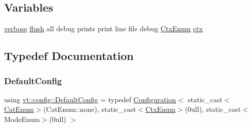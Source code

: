 \subsection*{Variables}
\begin{DoxyCompactItemize}
\item 
\hyperlink{namespacevt_1_1config_a724e99568632cc0fe9c456c2230270d0a9b54bf70f7b7fe7cfb6f3da0e167ae27}{verbose} \hyperlink{namespacevt_1_1config_a724e99568632cc0fe9c456c2230270d0a5c484f36b0f33ded7e640cc30fe5e725}{flush} all debug prints print line file debug \hyperlink{namespacevt_1_1config_a46e57c33bee1b9f1fa95455af86d80e0}{Ctx\+Enum} \hyperlink{namespacevt_1_1config_a0551245b6b893932b95aaf8eac94eed1}{ctx}
\end{DoxyCompactItemize}


\subsection{Typedef Documentation}
\mbox{\label{namespacevt_1_1config_a889b68143f3ecf39ea84dadfb9dfda3f}} 
\subsubsection{\texorpdfstring{Default\+Config}{DefaultConfig}}
{\footnotesize\ttfamily using \hyperlink{namespacevt_1_1config_a889b68143f3ecf39ea84dadfb9dfda3f}{vt\+::config\+::\+Default\+Config} = typedef \hyperlink{structvt_1_1config_1_1_configuration}{Configuration}$<$ static\+\_\+cast$<$\hyperlink{namespacevt_1_1config_a6bd1d6215bda0d8ca02811798399f689}{Cat\+Enum}$>$(Cat\+Enum\+::none), static\+\_\+cast$<$\hyperlink{namespacevt_1_1config_a46e57c33bee1b9f1fa95455af86d80e0}{Ctx\+Enum}$>$(0ull), static\+\_\+cast$<$\+Mode\+Enum$>$(0ull) $>$}

\mbox{\label{namespacevt_1_1config_aea109b59c3cb20cb90200caf8da049b9}} 
